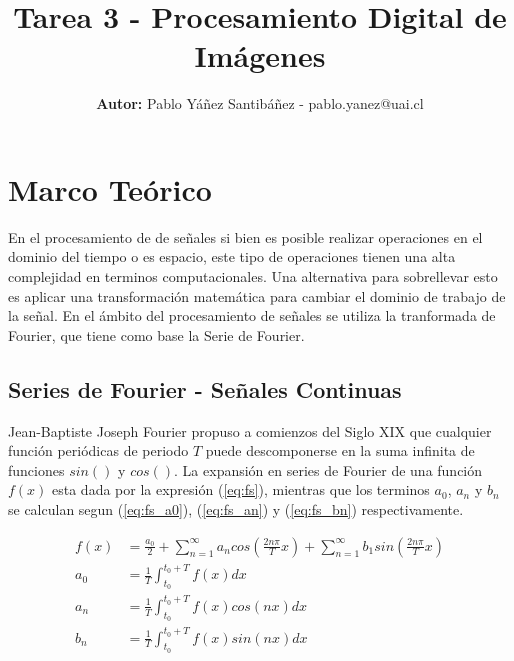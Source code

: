 \documentclass[
  letterpaper,
  twocolumn,
  9pt,
  journal,
  final]{IEEEtran}
\title{Tarea 3 - Procesamiento Digital de Imágenes}
\author{\textbf{Autor:} Pablo Yáñez Santibáñez - pablo.yanez@uai.cl}
\begin{document}
\maketitle


\tableofcontents



\section{Marco Teórico}

En el procesamiento de de señales si bien es posible realizar operaciones en el dominio del tiempo o es espacio, este tipo de operaciones tienen una alta complejidad en terminos computacionales. Una alternativa para sobrellevar esto es aplicar una transformación matemática para cambiar el dominio de trabajo de la señal. En el ámbito del procesamiento de señales se utiliza la tranformada de Fourier, que tiene como base la Serie de Fourier.

\subsection{Series de Fourier - Señales Continuas}

Jean-Baptiste Joseph Fourier propuso a comienzos del Siglo XIX que cualquier función periódicas de periodo $T$ puede descomponerse en la suma infinita de funciones $sin()$ y $cos()$. La expansión en series de Fourier de una función $f(x)$ esta dada por la expresión (\ref{eq:fs}), mientras que los terminos $a_0$, $a_n$ y $b_n$ se calculan segun (\ref{eq:fs_a0}), (\ref{eq:fs_an}) y (\ref{eq:fs_bn}) respectivamente.




\begin{align}
	f(x) &= \frac{a_0}{2} + \sum_{n=1}^{\infty} a_n cos \left(\frac{2n\pi}{T}x\right) + \sum_{n=1}^{\infty} b_1 sin\left(\frac{2n\pi}{T}x\right) \label{eq:fs} \\
	a_0 &= \frac{1}{T} \int_{t_0}^{t_0 + T} f(x) dx \label{eq:fs_a0} \\
	a_n &= \frac{1}{T} \int_{t_0}^{t_0 + T} f(x) cos(nx) dx \label{eq:fs_an}\\
	b_n &= \frac{1}{T} \int_{t_0}^{t_0 + T} f(x) sin(nx) dx \label{eq:fs_bn}
\end{align}
\end{document}
